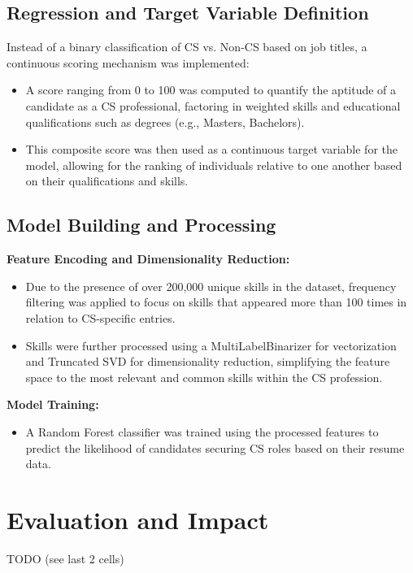 \documentclass[11pt]{article}
\begin{document}
\subsection{Regression and Target Variable Definition}

Instead of a binary classification of CS vs. Non-CS based on job titles, a continuous scoring mechanism was implemented:
\begin{itemize}
    \item A score ranging from 0 to 100 was computed to quantify the aptitude of a candidate as a CS professional, factoring in weighted skills and educational qualifications such as degrees (e.g., Masters, Bachelors).
    \item This composite score was then used as a continuous target variable for the model, allowing for the ranking of individuals relative to one another based on their qualifications and skills.
\end{itemize}

\subsection{Model Building and Processing}

\textbf{Feature Encoding and Dimensionality Reduction:}
\begin{itemize}
    \item Due to the presence of over 200,000 unique skills in the dataset, frequency filtering was applied to focus on skills that appeared more than 100 times in relation to CS-specific entries.
    \item Skills were further processed using a MultiLabelBinarizer for vectorization and Truncated SVD for dimensionality reduction, simplifying the feature space to the most relevant and common skills within the CS profession.
\end{itemize}

\textbf{Model Training:}
\begin{itemize}
    \item A Random Forest classifier was trained using the processed features to predict the likelihood of candidates securing CS roles based on their resume data.
\end{itemize}

\section{Evaluation and Impact}
TODO (see last 2 cells)
\end{document}
